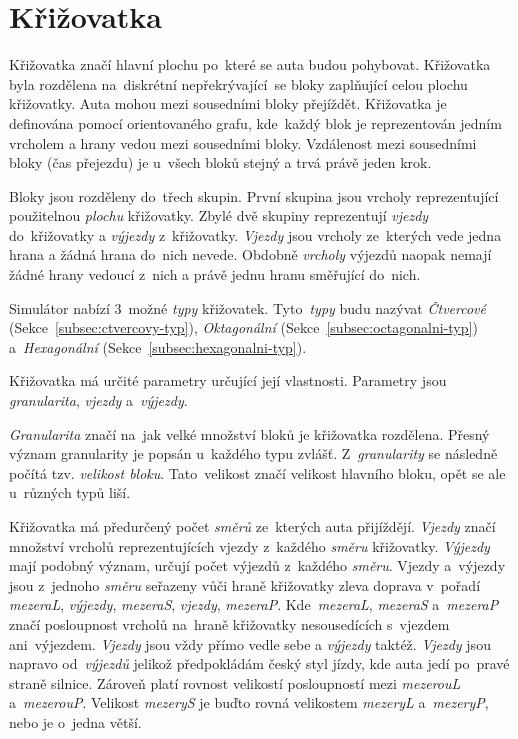 \section{Křižovatka}\label{sec:krizovatka}

Křižovatka značí hlavní plochu po~které se auta budou pohybovat.
Křižovatka byla rozdělena na~diskrétní nepřekrývající~se bloky zaplňující celou plochu křižovatky.
Auta mohou mezi sousedními bloky přejíždět.
Křižovatka je definována pomocí orientovaného grafu, kde~každý blok je reprezentován jedním vrcholem a hrany vedou mezi sousedními bloky.
Vzdálenost mezi sousedními bloky (čas přejezdu) je u~všech bloků stejný a trvá právě jeden krok.

Bloky jsou rozděleny do~třech skupin.
První skupina jsou vrcholy reprezentující použitelnou \emph{plochu} křižovatky.
Zbylé dvě skupiny reprezentují \emph{vjezdy} do~křižovatky a \emph{výjezdy} z~křižovatky.
\emph{Vjezdy} jsou vrcholy ze~kterých vede jedna hrana a žádná hrana do~nich nevede.
Obdobně \emph{vrcholy} výjezdů naopak nemají žádné hrany vedoucí z~nich a právě jednu hranu směřující do~nich.

Simulátor nabízí $3$~možné \emph{typy} křižovatek.
Tyto~\emph{typy} budu nazývat \emph{Čtvercové} (Sekce~\ref{subsec:ctvercovy-typ}), \emph{Oktagonální} (Sekce~\ref{subsec:octagonalni-typ})
a~\emph{Hexagonální} (Sekce~\ref{subsec:hexagonalni-typ}).

Křižovatka má určité parametry určující její vlastnosti.
Parametry jsou \emph{granularita}, \emph{vjezdy} a~\emph{výjezdy}.

\emph{Granularita} značí na~jak velké množství bloků je křižovatka rozdělena.
Přesný význam granularity je popsán u~každého typu zvlášť.
Z~\emph{granularity} se následně počítá tzv. \emph{velikost bloku}.
Tato~velikost značí velikost hlavního bloku, opět se ale u~různých typů liší.

Křižovatka má předurčený počet \emph{směrů} ze~kterých auta přijíždějí.
\emph{Vjezdy} značí množství vrcholů reprezentujících vjezdy z~každého \emph{směru} křižovatky.
\emph{Výjezdy} mají podobný význam, určují počet výjezdů z~každého \emph{směru}.
Vjezdy a~výjezdy jsou z~jednoho \emph{směru} seřazeny vůči hraně křižovatky zleva doprava v~pořadí
\emph{mezeraL}, \emph{výjezdy}, \emph{mezeraS}, \emph{vjezdy}, \emph{mezeraP}.
Kde~\emph{mezeraL}, \emph{mezeraS} a~\emph{mezeraP} značí posloupnost vrcholů na~hraně křižovatky
nesousedících s~vjezdem ani~výjezdem.
\emph{Vjezdy} jsou vždy přímo vedle sebe a \emph{výjezdy} taktéž.
\emph{Vjezdy} jsou napravo od~\emph{výjezdů} jelikož předpokládám český styl jízdy, kde auta jedí po~pravé straně silnice.
Zároveň platí rovnost velikostí posloupností mezi \emph{mezerouL} a~\emph{mezerouP}.
Velikost \emph{mezeryS} je buďto rovná velikostem \emph{mezeryL} a~\emph{mezeryP}, nebo je o~jedna větší.


